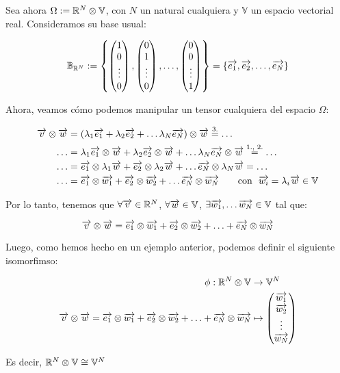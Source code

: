 \begin{ejemplo}
    Sea ahora $\Omega := \mathbb{R}^N \otimes \mathbb{V}$, con $N$ un natural cualquiera y $\mathbb{V}$ un espacio vectorial real. Consideramos su base usual:

    $$\mathbb{B}_{\mathbb{R}^N} := \left\{\begin{pmatrix} 1 \\ 0 \\ \vdots \\ 0 \end{pmatrix}, \begin{pmatrix} 0 \\ 1 \\ \vdots \\ 0 \end{pmatrix}, \ldots, \begin{pmatrix} 0 \\ 0 \\ \vdots \\ 1 \end{pmatrix} \right\} = \left\{\overrightarrow{e_1}, \overrightarrow{e_2}, \ldots, \overrightarrow{e_N} \right\}$$

    Ahora, veamos cómo podemos manipular un tensor cualquiera del espacio $\Omega$:

    \begin{equation}
    \begin{split}
        \overrightarrow{v} \otimes \overrightarrow{w} &= (\lambda_1 \overrightarrow{e_1} + \lambda_2 \overrightarrow{e_2} + \ldots \lambda_N \overrightarrow{e_N}) \otimes \overrightarrow{w} \stackrel{\text{3.}}{=} \ldots \\
        \ldots &= \lambda_1 \overrightarrow{e_1} \otimes \overrightarrow{w} + \lambda_2 \overrightarrow{e_2} \otimes \overrightarrow{w} + \ldots \lambda_N \overrightarrow{e_N} \otimes \overrightarrow{w} \stackrel{\text{1., 2.}}{=} \ldots \\
        \ldots &= \overrightarrow{e_1} \otimes \lambda_1 \overrightarrow{w} + \overrightarrow{e_2} \otimes \lambda_2 \overrightarrow{w} + \ldots \overrightarrow{e_N} \otimes \lambda_N \overrightarrow{w} = \ldots \\
        \ldots &= \overrightarrow{e_1} \otimes \overrightarrow{w_1} + \overrightarrow{e_2} \otimes \overrightarrow{w_2} + \ldots \overrightarrow{e_N} \otimes \overrightarrow{w_N} \qquad \text{con} \ \  \overrightarrow{w_i} = \lambda_i \overrightarrow{w} \in \mathbb{V}
    \end{split}
    \end{equation}

    Por lo tanto, tenemos que $\forall \overrightarrow{v} \in \mathbb{R}^N$, $\forall \overrightarrow{w} \in \mathbb{V}$, $\exists \overrightarrow{w_1}, \ldots \overrightarrow{w_N} \in \mathbb{V}$ tal que:

    $$\overrightarrow{v} \otimes \overrightarrow{w} = \overrightarrow{e_1} \otimes \overrightarrow{w_1} + \overrightarrow{e_2} \otimes \overrightarrow{w_2} + \ldots + \overrightarrow{e_N} \otimes \overrightarrow{w_N}$$

    Luego, como hemos hecho en un ejemplo anterior, podemos definir el siguiente isomorfimso:

    \begin{equation}
    \begin{split}
        \phi: \mathbb{R}^N \otimes \mathbb{V} &\to \mathbb{V}^N \\
        \overrightarrow{v} \otimes \overrightarrow{w} = \overrightarrow{e_1} \otimes \overrightarrow{w_1} + \overrightarrow{e_2} \otimes \overrightarrow{w_2} + \ldots + \overrightarrow{e_N} \otimes \overrightarrow{w_N} &\mapsto \begin{pmatrix} \overrightarrow{w_1} \\ \overrightarrow{w_2} \\ \vdots \\ \overrightarrow{w_N} \end{pmatrix}
    \end{split}
    \end{equation}

    Es decir, $\mathbb{R}^N \otimes \mathbb{V} \cong \mathbb{V}^N$


\end{ejemplo}

